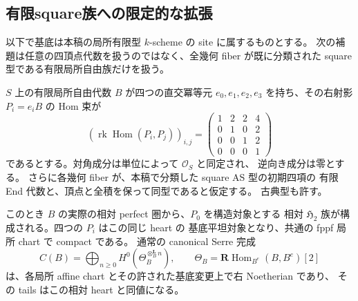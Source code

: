 \subsection{有限square族への限定的な拡張}
\label{subsec:qa-finite-square-family-opposite}

以下で基底は本稿の局所有限型 $k$-scheme の site に属するものとする。
次の補題は任意の四頂点代数を扱うのではなく、全幾何 fiber が既に分類された
square 型である有限局所自由族だけを扱う。

\begin{lemma}[分類済みfiberを持つ有限square族]
\label{lem:qa-classified-fiber-finite-square-recognition}
$S$ 上の有限局所自由代数 $B$ が四つの直交冪等元
$e_0,e_1,e_2,e_3$ を持ち、その右射影 $P_i=e_iB$ の Hom 束が
\[
 \left(\operatorname{rk}\operatorname{Hom}(P_i,P_j)\right)_{i,j}
 =\begin{pmatrix}1&2&2&4\\0&1&0&2\\0&0&1&2\\0&0&0&1\end{pmatrix}
\]
であるとする。対角成分は単位によって $\mathcal O_S$ と同定され、
逆向き成分は零とする。
さらに各幾何 fiber が、本稿で分類した square AS 型の初期四項の
有限 End 代数と、頂点と全積を保って同型であると仮定する。
古典型も許す。

このとき $B$ の実際の相対 perfect 圏から、$P_0$ を構造対象とする
相対 $\mathfrak H_2$ 族が構成される。四つの $P_i$ はこの同じ heart の
基底平坦対象となり、共通の fppf 局所 chart で compact である。
通常の canonical Serre 完成
\[
 C(B)=\bigoplus_{n\geq0}
 H^0\left(\Theta_B^{\otimes_B^{\mathbf L}n}\right),\qquad
 \Theta_B=\mathbf R\operatorname{Hom}_{B^e}(B,B^e)[2]
\]
は、各局所 affine chart とその許された基底変更上で右 Noetherian であり、
その tails はこの相対 heart と同値になる。
\end{lemma}
